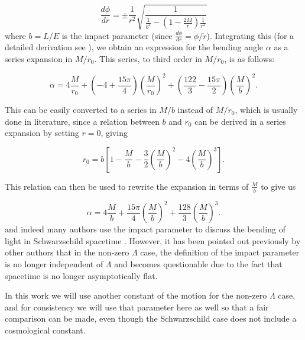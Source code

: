 \begin{equation}
  \frac{d\phi}{dr} = \pm \frac{1}{r^2} \sqrt{\frac{1}{ \frac{1}{b^2} - \left (1- \frac{2M}{r} \right )\frac{1}{r^2} }}
  \label{eq:dphi-dr}
\end{equation}
where $b = L/E$ is the impact parameter (since $\frac{d\phi}{dr} = \dot{\phi}/\dot{r}$). Integrating this (for a detailed derivation see \cite{keeton2005formalism}), we obtain an expression for the bending angle $\alpha$ as a series expansion in $M/r_0$. This series, to third order in $M/r_0$, is as follows:

\begin{equation}
  \alpha = 4 \frac{M}{r_0} + \left ( -4 + \frac{15\pi}{4} \right )\left ( \frac{M}{r_0}\right )^2 + \left ( \frac{122}{3} - \frac{15\pi}{2} \right )\left ( \frac{M}{b}\right )^2.
  \label{eq:lensing-series-expansion-r0}
\end{equation}

This can be easily converted to a series in $M/b$ instead of $M/r_0$, which is usually done in literature, since a relation between $b$ and $r_0$ can be derived in a series expansion by setting $\dot{r} = 0$, giving \citep{keeton2005formalism}

\begin{equation}
  r_0 = b \left [ 1 - \frac{M}{b} - \frac{3}{2} \left ( \frac{M}{b}\right)^2 - 4\left ( \frac{M}{b}\right)^3 \right ].
  \label{eq:b-r0-relation}
\end{equation} 

This relation can then be used to rewrite the expansion in terms of $\frac{M}{b}$ to give us

\begin{equation}
  \alpha = 4 \frac{M}{b} + \frac{15\pi}{4} \left ( \frac{M}{b} \right )^2 + \frac{128}{3} \left ( \frac{M}{b} \right )^3.
  \label{eq:series-expansion-b}
\end{equation}
and indeed many authors use the impact parameter to discuss the bending of light in Schwarzschild spacetime \citep{wald2010general,misner2017gravitation,butcher2016no}. However, it has been pointed out previously by other authors \citep{ishak2008new,hammad2013note,lebedev2013influence} that in the non-zero $\Lambda$ case, the definition of the impact parameter is no longer independent of $\Lambda$ and becomes questionable due to the fact that spacetime is no longer asymptotically flat. 

In this work we will use another constant of the motion for the non-zero $\Lambda$ case, and for consistency we will use that parameter here as well so that a fair comparison can be made, even though the Schwarzschild case does not include a cosmological constant.

